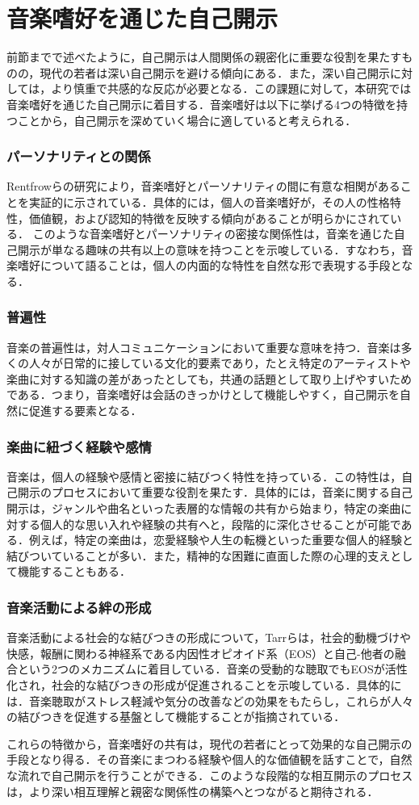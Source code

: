 \section{音楽嗜好を通じた自己開示}\label{音楽}
前節までで述べたように，自己開示は人間関係の親密化に重要な役割を果たすものの，現代の若者は深い自己開示を避ける傾向にある．また，深い自己開示に対しては，より慎重で共感的な反応が必要となる．この課題に対して，本研究では音楽嗜好を通じた自己開示に着目する．音楽嗜好は以下に挙げる4つの特徴を持つことから，自己開示を深めていく場合に適していると考えられる．


\subsubsection{パーソナリティとの関係}
Rentfrowら\cite{rentfrow_2003}\cite{rentfrow_2006}\cite{rentfrow_2007}の研究により，音楽嗜好とパーソナリティの間に有意な相関があることを実証的に示されている．具体的には，個人の音楽嗜好が，その人の性格特性，価値観，および認知的特徴を反映する傾向があることが明らかにされている．
このような音楽嗜好とパーソナリティの密接な関係性は，音楽を通じた自己開示が単なる趣味の共有以上の意味を持つことを示唆している．すなわち，音楽嗜好について語ることは，個人の内面的な特性を自然な形で表現する手段となる．


\subsubsection{普遍性}
音楽の普遍性は，対人コミュニケーションにおいて重要な意味を持つ．音楽は多くの人々が日常的に接している文化的要素であり，たとえ特定のアーティストや楽曲に対する知識の差があったとしても，共通の話題として取り上げやすいためである．つまり，音楽嗜好は会話のきっかけとして機能しやすく，自己開示を自然に促進する要素となる．


\subsubsection{楽曲に紐づく経験や感情}
音楽は，個人の経験や感情と密接に結びつく特性を持っている．この特性は，自己開示のプロセスにおいて重要な役割を果たす．具体的には，音楽に関する自己開示は，ジャンルや曲名といった表層的な情報の共有から始まり，特定の楽曲に対する個人的な思い入れや経験の共有へと，段階的に深化させることが可能である．例えば，特定の楽曲は，恋愛経験や人生の転機といった重要な個人的経験と結びついていることが多い．また，精神的な困難に直面した際の心理的支えとして機能することもある．


\subsubsection{音楽活動による絆の形成}
音楽活動による社会的な結びつきの形成について，Tarrら\cite{tarr_2014}は，社会的動機づけや快感，報酬に関わる神経系である内因性オピオイド系（EOS）と自己-他者の融合という2つのメカニズムに着目している．音楽の受動的な聴取でもEOSが活性化され，社会的な結びつきの形成が促進されることを示唆している．具体的には．音楽聴取がストレス軽減や気分の改善などの効果をもたらし，これらが人々の結びつきを促進する基盤として機能することが指摘されている．

これらの特徴から，音楽嗜好の共有は，現代の若者にとって効果的な自己開示の手段となり得る．その音楽にまつわる経験や個人的な価値観を話すことで，自然な流れで自己開示を行うことができる．このような段階的な相互開示のプロセスは，より深い相互理解と親密な関係性の構築へとつながると期待される．